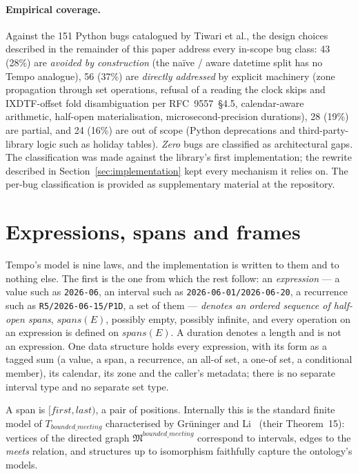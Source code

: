 \paragraph*{Empirical coverage.} Against the 151 Python bugs
catalogued by Tiwari et al., the design choices described in the
remainder of this paper address every in-scope bug class: 43 (28\%)
are \emph{avoided by construction} (the na\"ive / aware datetime
split has no Tempo analogue), 56 (37\%) are \emph{directly addressed}
by explicit machinery (zone propagation through set operations,
refusal of a reading the clock skips and IXDTF-offset fold
disambiguation per RFC~9557~\S 4.5, calendar-aware arithmetic,
half-open materialisation, microsecond-precision durations), 28 (19\%)
are partial, and 24 (16\%) are out of scope (Python deprecations and
third-party-library logic such as holiday tables). \emph{Zero} bugs
are classified as architectural gaps. The classification was made
against the library's first implementation; the rewrite described in
Section~\ref{sec:implementation} kept every mechanism it relies on.
The per-bug classification is provided as supplementary material at
the repository.

\section{Expressions, spans and frames}
\label{sec:model}

Tempo's model is nine laws, and the implementation is written to them
and to nothing else. The first is the one from which the rest follow:
an \emph{expression} --- a value such as \texttt{2026-06}, an interval
such as \texttt{2026-06-01/2026-06-20}, a recurrence such as
\texttt{R5/2026-06-15/P1D}, a set of them --- \emph{denotes an ordered
sequence of half-open spans}, $\mathit{spans}(E)$, possibly empty,
possibly infinite, and every operation on an expression is defined on
$\mathit{spans}(E)$. A duration denotes a length and is not an
expression. One data structure holds every expression, with its form
as a tagged sum (a value, a span, a recurrence, an all-of set, a one-of
set, a conditional member), its calendar, its zone and the caller's
metadata; there is no separate interval type and no separate set type.

A span is $[\mathit{first}, \mathit{last})$, a pair of positions.
Internally this is the standard finite model of $T_{bounded\_meeting}$
characterised by Gr\"uninger and Li~\cite{gruninger2017allenontology}
(their Theorem~15): vertices of the directed graph
$\mathfrak{M}^{bounded\_meeting}$ correspond to intervals, edges to the
\textit{meets} relation, and structures up to isomorphism faithfully
capture the ontology's models.


